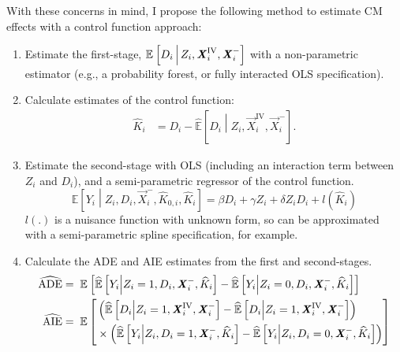 With these concerns in mind, I propose the following method to estimate CM effects with a control function approach:
\begin{enumerate}
    \item Estimate the first-stage, $\mathbb{E}_{} \left[ D_i \, \middle\vert \, Z_i, \boldsymbol{\mathit{X}}_i^{\text{IV}}, \boldsymbol{\mathit{X}}_i^- \right]$ with a non-parametric estimator (e.g., a probability forest, or fully interacted OLS specification).
    \item Calculate estimates of the control function:
    \begin{align*}
        \hat K_i &= D_i - \hat{\mathbb E} \left[D_i \middle\vert Z_i, \vec X_i^{\text{IV}}, \vec X_i^- \right].
    \end{align*}
    \item Estimate the second-stage with OLS (including an interaction term between $Z_i$ and $D_i$), and a semi-parametric regressor of the control function.
    \[ \mathbb{E} \left[Y_i \middle\vert Z_i, D_i, \vec X_i^-, \hat K_{0,i}, \hat K_{i}\right]
    = \beta D_i + \gamma Z_i + \delta Z_i D_i + l\left( \hat K_{i}\right) \]
    $l(.)$ is a nuisance function with unknown form, so can be approximated with a semi-parametric spline specification, for example.
    \item Calculate the ADE and AIE estimates from the first and second-stages.
    \begin{align*}
        \widehat{\text{ADE}} &= \; \mathbb{E}_{} \left[ 
            \widehat{\mathbb{E}} \left[ Y_i \middle\vert Z_i = 1, D_i, \boldsymbol{\mathit{X}}_i^-, \widehat{K}_i \right]
            - \widehat{\mathbb{E}} \left[ Y_i \middle\vert Z_i = 0, D_i, \boldsymbol{\mathit{X}}_i^-, \widehat{K}_i \right] \right] \\
        \widehat{\text{AIE}} &= \; \mathbb E \left[ \begin{aligned} &\left(
            \widehat{\mathbb{E}} \left[D_i \middle\vert Z_i = 1, \boldsymbol{\mathit{X}}_i^{\text{IV}}, \boldsymbol{\mathit{X}}_i^-\right]
            - \widehat{\mathbb{E}} \left[D_i \middle\vert Z_i = 1, \boldsymbol{\mathit{X}}_i^{\text{IV}}, \boldsymbol{\mathit{X}}_i^-\right] \right) \\
            &\times \left(
                \widehat{\mathbb{E}} \left[ Y_i \middle\vert Z_i, D_i = 1, \boldsymbol{\mathit{X}}_i^-, \widehat{K}_i \right]
            - \widehat{\mathbb{E}} \left[ Y_i \middle\vert Z_i, D_i = 0, \boldsymbol{\mathit{X}}_i^-, \widehat{K}_i \right]
            \right) \end{aligned} \right]
    \end{align*}

\end{enumerate}

